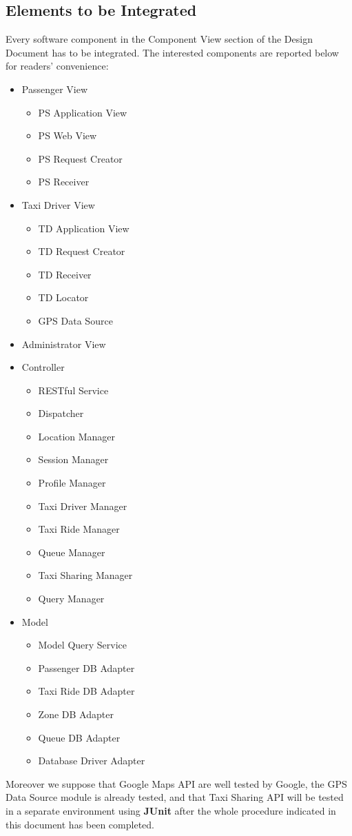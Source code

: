 \subsection{Elements to be Integrated}
Every software component in the Component View section of the Design Document has to be integrated.
The interested components are reported below for readers' convenience:
\begin{itemize}
	\item Passenger View
	\begin{itemize}
		\item PS Application View
		\item PS Web View
		\item PS Request Creator
		\item PS Receiver
	\end{itemize}
	\item Taxi Driver View
	\begin{itemize}
		\item TD Application View
		\item TD Request Creator
		\item TD Receiver
		\item TD Locator
		\item GPS Data Source
	\end{itemize}
	\item Administrator View
	\item Controller
	\begin{itemize}
		\item RESTful Service
		\item Dispatcher
		\item Location Manager
		\item Session Manager
		\item Profile Manager
		\item Taxi Driver Manager
		\item Taxi Ride Manager
		\item Queue Manager
		\item Taxi Sharing Manager
		\item Query Manager
	\end{itemize}
	\item Model
	\begin{itemize}
		\item Model Query Service
		\item Passenger DB Adapter
		\item Taxi Ride DB Adapter
		\item Zone DB Adapter
		\item Queue DB Adapter
		\item Database Driver Adapter
	\end{itemize}
\end{itemize}
Moreover we suppose that Google Maps API are well tested by Google, the GPS Data Source module is already tested, and that \myTaxiService{} Taxi Sharing API will be tested in a separate environment using \textbf{JUnit} after the whole procedure indicated in this document has been completed.

